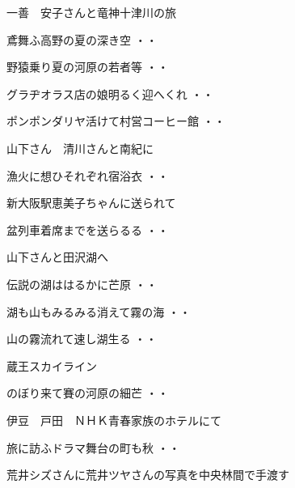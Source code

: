\vspace{0.6cm}
\noindent
一善　安子さんと竜神十津川の旅
\begin{shiika}鳶舞ふ高野の夏の深き空
\hfill{・・}\end{shiika}
\begin{shiika}野猿乗り夏の河原の若者等
\hfill{・・}\end{shiika}
\begin{shiika}グラヂオラス店の娘明るく迎へくれ
\hfill{・・}\end{shiika}
\begin{shiika}ポンポンダリヤ活けて村営コーヒー館
\hfill{・・}\end{shiika}
\vspace{0.6cm}
山下さん　清川さんと南紀に
\begin{shiika}漁火に想ひそれぞれ宿浴衣
\hfill{・・}\end{shiika}
\vspace{0.6cm}
新大阪駅恵美子ちゃんに送られて
\begin{shiika}盆列車着席までを送らるる
\hfill{・・}\end{shiika}
\vspace{0.6cm}
山下さんと田沢湖へ
\begin{shiika}伝説の湖ははるかに芒原
\hfill{・・}\end{shiika}
\begin{shiika}湖も山もみるみる消えて霧の海
\hfill{・・}\end{shiika}
\begin{shiika}山の霧流れて速し湖生る
\hfill{・・}\end{shiika}
\vspace{0.6cm}
蔵王スカイライン
\begin{shiika}のぼり来て賽の河原の細芒
\hfill{・・}\end{shiika}
\vspace{0.6cm}
伊豆　戸田　ＮＨＫ青春家族のホテルにて
\begin{shiika}旅に訪ふドラマ舞台の町も秋
\hfill{・・}\end{shiika}
\vspace{0.6cm}
荒井シズさんに荒井ツヤさんの写真を中央林間で手渡す
